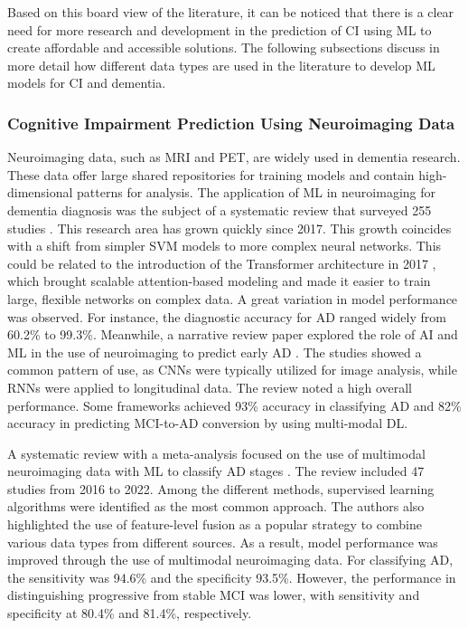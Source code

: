 Based on this board view of the literature, it can be noticed that there is a clear need for more research and development in the prediction of CI using ML to create affordable and accessible solutions. The following subsections discuss in more detail how different data types are used in the literature to develop ML models for CI and dementia.

\subsubsection{Cognitive Impairment Prediction Using Neuroimaging Data}

Neuroimaging data, such as MRI and PET, are widely used in dementia research. These data offer large shared repositories for training models and contain high-dimensional patterns for analysis. The application of ML in neuroimaging for dementia diagnosis was the subject of a systematic review that surveyed 255 studies \cite{Borchert2023Artificial}. This research area has grown quickly since 2017. This growth coincides with a shift from simpler SVM models to more complex neural networks. This could be related to the introduction of the Transformer architecture in 2017 \cite{Vaswani2017Attention}, which brought scalable attention-based modeling and made it easier to train large, flexible networks on complex data. A great variation in model performance was observed. For instance, the diagnostic accuracy for AD ranged widely from 60.2\% to 99.3\%. Meanwhile, a narrative review paper explored the role of AI and ML in the use of neuroimaging to predict early AD \cite{Rudroff2024AI}. The studies showed a common pattern of use, as CNNs were typically utilized for image analysis, while RNNs were applied to longitudinal data. The review noted a high overall performance. Some frameworks achieved 93\% accuracy in classifying AD and 82\% accuracy in predicting MCI-to-AD conversion by using multi-modal DL.

A systematic review with a meta-analysis focused on the use of multimodal neuroimaging data with ML to classify AD stages \cite{Odusami2024Machine}. The review included 47 studies from 2016 to 2022. Among the different methods, supervised learning algorithms were identified as the most common approach. The authors also highlighted the use of feature-level fusion as a popular strategy to combine various data types from different sources. As a result,  model performance was improved through the use of multimodal neuroimaging data. For classifying AD, the sensitivity was 94.6\% and the specificity 93.5\%. However, the performance in distinguishing progressive from stable MCI was lower, with sensitivity and specificity at 80.4\% and 81.4\%, respectively.

